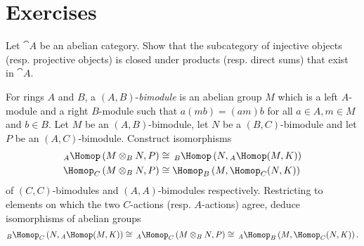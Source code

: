 \documentclass[../main.tex]{subfiles}
\begin{document}
\section{Exercises}


\begin{exe}
    Let $\cat A$ be an abelian category. Show that the subcategory of injective objects (resp. projective objects) is closed under products (resp. direct sums) that exist in $\cat A$.
\end{exe}

\begin{exe}\label{exe:homtensoradjunction}
    For rings $A$ and $B$, a $(A,B)$-\emph{bimodule} is an abelian group $M$ which is a left $A$-module and a right $B$-module such that $a(mb) = (am)b$ for all $a\in A, m\in M$ and $b\in B$. Let $M$ be an $(A, B)$-bimodule, let $N$ be a $(B,C)$-bimodule and let $P$ be an $(A,C)$-bimodule. Construct isomorphisms
    \begin{align*}
        {}_A\Hom\left(M\otimes_B N, P\right) &\cong\, _B\Hom\left(N, {}_A\Hom(M, K)\right) \\ 
        \Hom[C]\left(M\otimes_B N, P\right) &\cong \Hom[B]\left(M, \Hom[C](N, K)\right)
    \end{align*}
    of $(C, C)$-bimodules and $(A, A)$-bimodules respectively. Restricting to elements on which the two $C$-actions (resp. $A$-actions) agree, deduce isomorphisms of abelian groups
    \[_B\Hom[C]\left(N, {}_A\Hom(M,K)\right) \cong \,_A\Hom[C]\left(M\otimes_B N, P\right) \cong\, {}_A\Hom[B]\left(M, \Hom[C](N,K)\right).\]
\end{exe}
\end{document}
